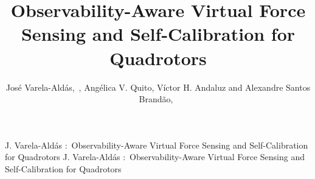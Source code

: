 \documentclass{ieeeaccess}
\begin{document}

\title{Observability-Aware Virtual Force Sensing and Self-Calibration for Quadrotors}

\author{{Jos\'e Varela-Ald\'as},~, {Ang\'elica V. Quito}, {Víctor H. Andaluz}  and {Alexandre Santos Brandão},~}

\address[1]{Centro de Investigaci\'on MIST, Facultad de Ingenier\'ias,
Universidad Tecnol\'ogica Indoam\'erica, \mbox{Ambato 180103}, Ecuador
(e-mail: josevarela@uti.edu.ec)}

\address[2]{Faculty of Digital Engineering and Emerging Technologies,
International University of Ecuador UIDE, Quito 170411, Ecuador
(e-mail: anquitoca@uide.edu.ec)}

\address[3]{Departamento de Eléctrica, Electrónica y Telecomunicaciones, Universidad de las Fuerzas Armadas ESPE, Sangolquí 171103, Ecuador (e-mail: vhandaluz1@espe.edu.ec)}

\address[4]{Núcleo de Especialização em Robótica, Programa de Pós-Graduação em Ciência da Computação, Departamento de Engenharia Elétrica, Universidade Federal de Viçosa, Viçosa 36570-900, MG, Brazil (e-mail: alexandre.brandao@ufv.br)}


\markboth
{J. Varela-Ald\'as \headeretal:~Observability-Aware Virtual Force Sensing and Self-Calibration for Quadrotors}
{J. Varela-Ald\'as \headeretal:~Observability-Aware Virtual Force Sensing and Self-Calibration for Quadrotors}

\end{document}
